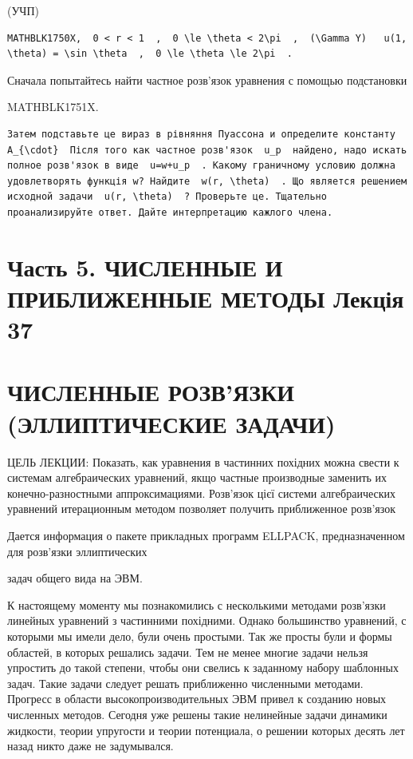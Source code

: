 \documentclass[
  ukrainian,
]{article}
\begin{document}
(УЧП)

\begin{verbatim}
MATHBLK1750X,  0 < r < 1  ,  0 \le \theta < 2\pi  ,  (\Gamma Y)   u(1, \theta) = \sin \theta  ,  0 \le \theta \le 2\pi  .
\end{verbatim}

Сначала попытайтесь найти частное розв'язок уравнения с помощью
подстановки

MATHBLK1751X.

\begin{verbatim}
Затем подставьте це вираз в рівняння Пуассона и определите константу  A_{\cdot}  Після того как частное розв'язок  u_p  найдено, надо искать полное розв'язок в виде  u=w+u_p  . Какому граничному условию должна удовлетворять функція w? Найдите  w(r, \theta)  . Що является решением исходной задачи  u(r, \theta)  ? Проверьте це. Тщательно проанализируйте ответ. Дайте интерпретацию кажлого члена.
\end{verbatim}

\section{Часть 5. ЧИСЛЕННЫЕ И ПРИБЛИЖЕННЫЕ МЕТОДЫ Лекція
37}\label{ux447ux430ux441ux442ux44c-5.-ux447ux438ux441ux43bux435ux43dux43dux44bux435-ux438-ux43fux440ux438ux431ux43bux438ux436ux435ux43dux43dux44bux435-ux43cux435ux442ux43eux434ux44b-ux43bux435ux43aux446ux456ux44f-37}

\section{ЧИСЛЕННЫЕ РОЗВ'ЯЗКИ (ЭЛЛИПТИЧЕСКИЕ
ЗАДАЧИ)}\label{ux447ux438ux441ux43bux435ux43dux43dux44bux435-ux440ux43eux437ux432ux44fux437ux43aux438-ux44dux43bux43bux438ux43fux442ux438ux447ux435ux441ux43aux438ux435-ux437ux430ux434ux430ux447ux438}

ЦЕЛЬ ЛЕКЦИИ: Показать, как уравнения в частинних похідних можна свести к
системам алгебраических уравнений, якщо частные производные заменить их
конечно-разностными аппроксимациями. Розв'язок цієї системи
алгебраических уравнений итерационным методом позволяет получить
приближенное розв'язок

Дается информация о пакете прикладных программ ELLPACK, предназначенном
для розв'язки эллиптических

задач общего вида на ЭВМ.

К настоящему моменту мы познакомились с несколькими методами розв'язки
линейных уравнений з частинними похідними. Однако большинство уравнений,
с которыми мы имели дело, були очень простыми. Так же просты були и
формы областей, в которых решались задачи. Тем не менее многие задачи
нельзя упростить до такой степени, чтобы они свелись к заданному набору
шаблонных задач. Такие задачи следует решать приближенно численными
методами. Прогресс в области высокопроизводительных ЭВМ привел к
созданию новых численных методов. Сегодня уже решены такие нелинейные
задачи динамики жидкости, теории упругости и теории потенциала, о
решении которых десять лет назад никто даже не задумывался.
\end{document}
